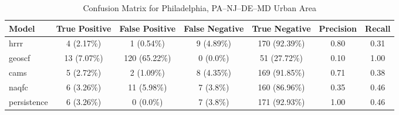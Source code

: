 \begin{table}[h!]
\centering
\begin{tabular}{lcccccc}
\hline
Model & True Positive & False Positive & False Negative & True Negative & Precision & Recall\\ \hline
hrrr & 4 (2.17\%) & 1 (0.54\%) & 9 (4.89\%) & 170 (92.39\%) & \cellcolor{red!25}0.80 & \cellcolor{red!25}0.31 \\ 
geoscf & 13 (7.07\%) & 120 (65.22\%) & 0 (0.0\%) & 51 (27.72\%) & \cellcolor{red!25}0.10 & \cellcolor{green!25}1.00 \\ 
cams & 5 (2.72\%) & 2 (1.09\%) & 8 (4.35\%) & 169 (91.85\%) & \cellcolor{red!25}0.71 & \cellcolor{red!25}0.38 \\ 
naqfc & 6 (3.26\%) & 11 (5.98\%) & 7 (3.8\%) & 160 (86.96\%) & \cellcolor{red!25}0.35 & \cellcolor{green!25}0.46 \\ 
persistence & 6 (3.26\%) & 0 (0.0\%) & 7 (3.8\%) & 171 (92.93\%) & 1.00 & 0.46 \\ 
\hline
\end{tabular}
\caption{Confusion Matrix for Philadelphia, PA--NJ--DE--MD Urban Area}
\end{table}
